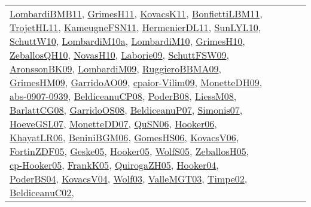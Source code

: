{\begin{longtable}{lp{3cm}>{\raggedright}p{6cm}>{\raggedright}p{6cm}p{8cm}}
\href{papers/LombardiBMB11.pdf}{LombardiBMB11}\cite{LombardiBMB11}, \href{papers/GrimesH11.pdf}{GrimesH11}\cite{GrimesH11}, \href{articles/KovacsK11.pdf}{KovacsK11}\cite{KovacsK11}, \href{papers/BonfiettiLBM11.pdf}{BonfiettiLBM11}\cite{BonfiettiLBM11}, \href{articles/TrojetHL11.pdf}{TrojetHL11}\cite{TrojetHL11}, \href{papers/KameugneFSN11.pdf}{KameugneFSN11}\cite{KameugneFSN11}, \href{papers/HermenierDL11.pdf}{HermenierDL11}\cite{HermenierDL11}, \href{papers/SunLYL10.pdf}{SunLYL10}\cite{SunLYL10}, \href{papers/SchuttW10.pdf}{SchuttW10}\cite{SchuttW10}, \href{articles/LombardiM10a.pdf}{LombardiM10a}\cite{LombardiM10a}, \href{papers/LombardiM10.pdf}{LombardiM10}\cite{LombardiM10}, \href{papers/GrimesH10.pdf}{GrimesH10}\cite{GrimesH10}, \href{articles/ZeballosQH10.pdf}{ZeballosQH10}\cite{ZeballosQH10}, \href{articles/NovasH10.pdf}{NovasH10}\cite{NovasH10}, \href{papers/Laborie09.pdf}{Laborie09}\cite{Laborie09}, \href{papers/SchuttFSW09.pdf}{SchuttFSW09}\cite{SchuttFSW09}, \href{papers/AronssonBK09.pdf}{AronssonBK09}\cite{AronssonBK09}, \href{papers/LombardiM09.pdf}{LombardiM09}\cite{LombardiM09}, \href{articles/RuggieroBBMA09.pdf}{RuggieroBBMA09}\cite{RuggieroBBMA09}, \href{papers/GrimesHM09.pdf}{GrimesHM09}\cite{GrimesHM09}, \href{articles/GarridoAO09.pdf}{GarridoAO09}\cite{GarridoAO09}, \href{papers/cpaior-Vilim09.pdf}{cpaior-Vilim09}\cite{cpaior-Vilim09}, \href{papers/MonetteDH09.pdf}{MonetteDH09}\cite{MonetteDH09}, \href{articles/abs-0907-0939.pdf}{abs-0907-0939}\cite{abs-0907-0939}, \href{papers/BeldiceanuCP08.pdf}{BeldiceanuCP08}\cite{BeldiceanuCP08}, \href{papers/PoderB08.pdf}{PoderB08}\cite{PoderB08}, \href{articles/LiessM08.pdf}{LiessM08}\cite{LiessM08}, \href{papers/BarlattCG08.pdf}{BarlattCG08}\cite{BarlattCG08}, \href{articles/GarridoOS08.pdf}{GarridoOS08}\cite{GarridoOS08}, \href{papers/BeldiceanuP07.pdf}{BeldiceanuP07}\cite{BeldiceanuP07}, \href{articles/Simonis07.pdf}{Simonis07}\cite{Simonis07}, \href{papers/HoeveGSL07.pdf}{HoeveGSL07}\cite{HoeveGSL07}, \href{papers/MonetteDD07.pdf}{MonetteDD07}\cite{MonetteDD07}, \href{papers/QuSN06.pdf}{QuSN06}\cite{QuSN06}, \href{articles/Hooker06.pdf}{Hooker06}\cite{Hooker06}, \href{articles/KhayatLR06.pdf}{KhayatLR06}\cite{KhayatLR06}, \href{papers/BeniniBGM06.pdf}{BeniniBGM06}\cite{BeniniBGM06}, \href{papers/GomesHS06.pdf}{GomesHS06}\cite{GomesHS06}, \href{papers/KovacsV06.pdf}{KovacsV06}\cite{KovacsV06}, \href{papers/FortinZDF05.pdf}{FortinZDF05}\cite{FortinZDF05}, \href{papers/Geske05.pdf}{Geske05}\cite{Geske05}, \href{articles/Hooker05.pdf}{Hooker05}\cite{Hooker05}, \href{papers/WolfS05.pdf}{WolfS05}\cite{WolfS05}, \href{articles/ZeballosH05.pdf}{ZeballosH05}\cite{ZeballosH05}, \href{papers/cp-Hooker05.pdf}{cp-Hooker05}\cite{cp-Hooker05}, \href{papers/FrankK05.pdf}{FrankK05}\cite{FrankK05}, \href{papers/QuirogaZH05.pdf}{QuirogaZH05}\cite{QuirogaZH05}, \href{papers/Hooker04.pdf}{Hooker04}\cite{Hooker04}, \href{articles/PoderBS04.pdf}{PoderBS04}\cite{PoderBS04}, \href{papers/KovacsV04.pdf}{KovacsV04}\cite{KovacsV04}, \href{papers/Wolf03.pdf}{Wolf03}\cite{Wolf03}, \href{papers/ValleMGT03.pdf}{ValleMGT03}\cite{ValleMGT03}, \href{articles/Timpe02.pdf}{Timpe02}\cite{Timpe02}, \href{papers/BeldiceanuC02.pdf}{BeldiceanuC02}\cite{BeldiceanuC02}, 
\end{longtable}}
